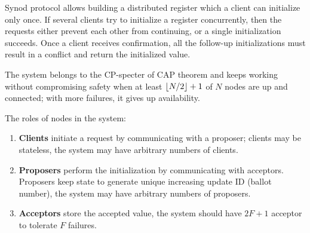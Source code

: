 \documentclass[12pt]{article}
\DeclarePairedDelimiter{\floor}{\lfloor}{\rfloor}
\begin{document}
Synod protocol allows building a distributed register which a client can initialize only once. If several clients try to initialize a register concurrently, then the requests either prevent each other from continuing, or a single initialization succeeds. Once a client receives confirmation, all the follow-up initializations must result in a conflict and return the initialized value.

The system belongs to the CP-specter of CAP theorem and keeps working without compromising safety when at least $\floor{N/2} + 1$ of $N$ nodes are up and connected; with more failures, it gives up availability.

The roles of nodes in the system:
\begin{enumerate}
  \item {\bf Clients} initiate a request by communicating with a proposer; clients may be stateless, the system may have arbitrary numbers of clients.
  \item {\bf Proposers} perform the initialization by communicating with acceptors. Proposers keep state to generate unique increasing update ID (ballot number), the system may have arbitrary numbers of proposers.
  \item {\bf Acceptors} store the accepted value, the system should have $2F+1$ acceptor to tolerate $F$ failures.
\end{enumerate}

\begin{figure}[!h]
  \centering
\end{figure}
\end{document}
